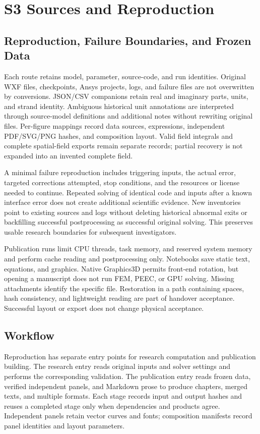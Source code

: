 \documentclass[11pt]{article}
\begin{document}
\section*{S3 Sources and Reproduction}
\hypertarget{chapter-S3}{}
\subsection*{Reproduction, Failure Boundaries, and Frozen Data}
\hypertarget{S3.report_repro.heading}{}
Each route retains model, parameter, source-code, and run identities. Original WXF files, checkpoints, Ansys projects, logs, and failure files are not overwritten by conversions. JSON/CSV companions retain real and imaginary parts, units, and strand identity. Ambiguous historical unit annotations are interpreted through source-model definitions and additional notes without rewriting original files. Per-figure mappings record data sources, expressions, independent PDF/SVG/PNG hashes, and composition layout. Valid field integrals and complete spatial-field exports remain separate records; partial recovery is not expanded into an invented complete field.


A minimal failure reproduction includes triggering inputs, the actual error, targeted corrections attempted, stop conditions, and the resources or license needed to continue. Repeated solving of identical code and inputs after a known interface error does not create additional scientific evidence. New inventories point to existing sources and logs without deleting historical abnormal exits or backfilling successful postprocessing as successful original solving. This preserves usable research boundaries for subsequent investigators.


Publication runs limit CPU threads, task memory, and reserved system memory and perform cache reading and postprocessing only. Notebooks save static text, equations, and graphics. Native Graphics3D permits front-end rotation, but opening a manuscript does not run FEM, PEEC, or GPU solving. Missing attachments identify the specific file. Restoration in a path containing spaces, hash consistency, and lightweight reading are part of handover acceptance. Successful layout or export does not change physical acceptance.


\subsection*{Workflow}
\hypertarget{S3.workflow.heading}{}
Reproduction has separate entry points for research computation and publication building. The research entry reads original inputs and solver settings and performs the corresponding validation. The publication entry reads frozen data, verified independent panels, and Markdown prose to produce chapters, merged texts, and multiple formats. Each stage records input and output hashes and reuses a completed stage only when dependencies and products agree. Independent panels retain vector curves and fonts; composition manifests record panel identities and layout parameters.
\end{document}
